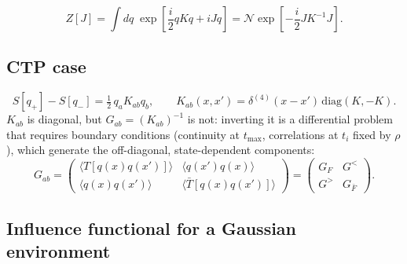 \documentclass[12pt,a4paper,oneside]{article}
\numberwithin{equation}{section}   %
\begin{document}
\begin{equation}
Z[J] = \int dq\;\exp\!\left[\frac{i}{2}qKq + iJq\right]
= \mathcal N \exp\!\left[-\frac{i}{2}JK^{-1}J\right].
\end{equation}

\subsection*{CTP case}

\begin{equation}
S[q_+]-S[q_-] = \tfrac12\,q_a K_{ab} q_b, \qquad
K_{ab}(x,x') = \delta^{(4)}(x-x')\,\mathrm{diag}(K,-K).
\end{equation}
$K_{ab}$ is diagonal, but $G_{ab}=(K_{ab})^{-1}$ is not: inverting it is a differential problem that requires boundary conditions (continuity at $t_{\max}$, correlations at $t_i$ fixed by $\rho$), which generate the off-diagonal, state-dependent components:
\begin{equation}
G_{ab} =
\begin{pmatrix}
\langle T[q(x)q(x')]\rangle & \langle q(x')q(x)\rangle \\
\langle q(x)q(x')\rangle & \langle \bar T[q(x)q(x')]\rangle
\end{pmatrix}
= \begin{pmatrix} G_F & G^< \\ G^> & G_{\bar F}\end{pmatrix}.
\end{equation}

\subsection*{Influence functional for a Gaussian environment}
\end{document}
